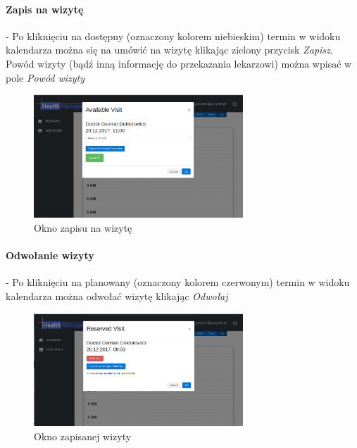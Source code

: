 \documentclass[polish,12pt]{aghthesis}
\begin{document}
    \paragraph{Zapis na wizytę}{  - Po kliknięciu na dostępny (oznaczony kolorem niebieskim) termin w widoku kalendarza można się na umówić na wizytę klikając zielony przycisk \emph{Zapisz}. Powód wizyty (bądź inną informację do przekazania lekarzowi) można wpisać w pole \emph{Powód wizyty}
    \begin{figure}[H]
        \includegraphics[width=0.7\textwidth]{gui-patient-unenrolled-visit-window}
        \caption{Okno zapisu na wizytę}
    \end{figure}    
    }
    \paragraph{Odwołanie wizyty}{- Po kliknięciu na planowany (oznaczony kolorem czerwonym) termin w widoku kalendarza można odwołać wizytę klikając \emph{Odwołaj}        
        \begin{figure}[H]
        \includegraphics[width=0.7\textwidth]{gui-patient-enrolled-visit-window}
        \caption{Okno zapisanej wizyty}
        \end{figure}  
    }
\end{document}
